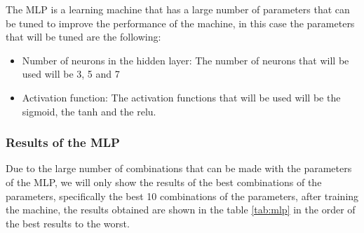 \documentclass{article}
\theoremstyle{mytheoremstyle}
\theoremstyle{mytheoremstyle}
\theoremstyle{myproblemstyle}
\begin{document}
The MLP is a learning machine that has a large number of parameters that can be tuned to improve the performance of the machine, in this case the parameters that will be tuned are the following:

\begin{itemize}
  \item Number of neurons in the hidden layer: The number of neurons that will be used will be 3, 5 and 7
  \item Activation function: The activation functions that will be used will be the sigmoid, the tanh and the relu.
\end{itemize}

\subsubsection*{Results of the MLP}

Due to the large number of combinations that can be made with the parameters of the MLP, we will only show the results of the best combinations of the parameters, specifically the best 10 combinations of the parameters, after training the machine, the results obtained are shown in the table \ref{tab:mlp} in the order of the best results to the worst.
\end{document}

